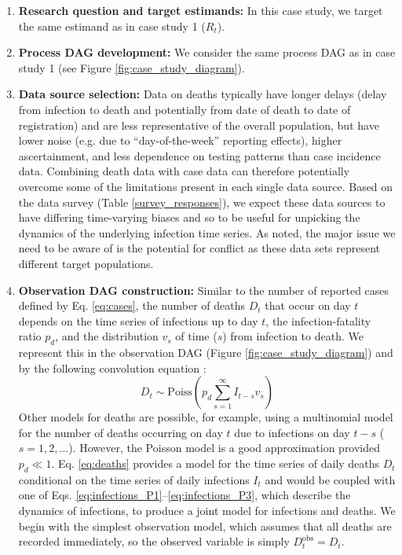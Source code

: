 \documentclass{article}
\begin{document}
\begin{enumerate}
   \item \textbf{Research question and target estimands:}  In this case study, we target the same estimand as in case study 1 ($R_t$). 
   
    \item \textbf{Process DAG development:} We consider the same process DAG as in case study 1 (see Figure \ref{fig:case_study_diagram}).
        
    \item \textbf{Data source selection:} Data on deaths typically have longer delays (delay from infection to death and potentially from date of death to date of registration) and are less representative of the overall population, but have lower noise (e.g. due to ``day-of-the-week'' reporting effects), higher ascertainment, and less dependence on testing patterns than case incidence data. Combining death data with case data can therefore potentially overcome some of the limitations present in each single data source. Based on the data survey (Table \ref{survey_responses}), we expect these data sources to have differing time-varying biases and so to be useful for unpicking the dynamics of the underlying infection time series. As noted, the major issue we need to be aware of is the potential for conflict as these data sets represent different target populations.
    
    \item \textbf{Observation DAG construction:} Similar to the number of reported cases defined by Eq. \eqref{eq:cases}, the number of deaths $D_t$ that occur on day $t$ depends on the time series of infections up to day $t$, the infection-fatality ratio $p_d$, and the distribution $v_s$ of time ($s$) from infection to death. We represent this in the observation DAG (Figure \ref{fig:case_study_diagram}) and by the following convolution equation \citep{bhatt2023semi}:
    \begin{equation} \label{eq:deaths}
        D_t \sim \mathrm{Poiss}\left(p_d \sum_{s=1}^\infty I_{t-s}v_s \right)
    \end{equation}
    Other models for deaths are possible, for example, using a multinomial model for the number of deaths occurring on day $t$ due to infections on day $t-s$ ($s=1,2,\ldots$). However, the Poisson model is a good approximation provided $p_d\ll 1$. 
    Eq. \eqref{eq:deaths} provides a model for the time series of daily deaths $D_t$ conditional on the time series of daily infections $I_t$ and would be coupled with one of Eqs. \eqref{eq:infections_P1}--\eqref{eq:infections_P3}, which describe the dynamics of infections, to produce a joint model for infections and deaths. We begin with the simplest observation model, which assumes that all deaths are recorded immediately, so the observed variable is simply $D^\mathrm{obs}_t=D_t$.
    



\end{enumerate}
\end{document}
